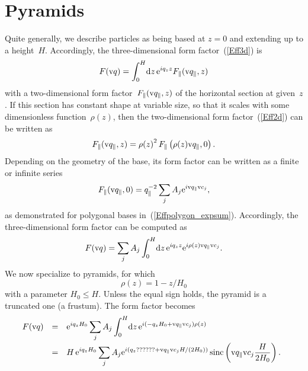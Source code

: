 %
%

\section{Pyramids}

%
%
%
%

Quite generally, we describe particles
as being based at $z=0$ and extending up to a height~$H$.
Accordingly,
the three-dimensional form factor~(\ref{Eff3d}) is
\begin{equation}
  F(\text{v}{q}) = \int_0^H\!\text{d} z\,\text{e}^{iq_z z} F_\parallel(\text{v}{q}_\parallel,z)
\end{equation}
with a two-dimensional form factor~$F_\parallel(\text{v}{q}_\parallel,z)$
of the horizontal section at given~$z$.
If this section has constant shape at variable size,
so that it scales with some dimensionless function~$\rho(z)$,
then the two-dimensional form factor~(\ref{Eff2d})
can be written as
\begin{equation}
  F_\parallel(\text{v}{q}_\parallel,z)
  = {\rho(z)}^2\, F_\parallel\left(\rho(z)\text{v}{q}_\parallel,0\right).
\end{equation}
Depending on the geometry of the base,
its form factor can be written as a finite or infinite series
\begin{equation}
  F_\parallel(\text{v}{q}_\parallel,0)=q_\parallel^{-2}\sum_j A_j \text{e}^{i\text{v}{q}_\parallel \text{v}{c}_j},
\end{equation}
as demonstrated for polygonal bases in~(\ref{Effpolygon_expsum}).
Accordingly, the three-dimensional form factor can be computed as
\begin{equation}
  F(\text{v}{q}) = \sum_j A_j \int_0^H\!\text{d} z\,\text{e}^{iq_z z} \text{e}^{i\rho(z)\text{v}{q}_\parallel \text{v}{c}_j}.
\end{equation}
We now specialize to pyramids,
for which
\begin{equation}
  \rho(z) = 1-z/H_0
\end{equation}
with a parameter $H_0\le H$.
Unless the equal sign holds,
the pyramid is a truncated one (a frustum).
The form factor becomes
\begin{equation}
  \begin{array}{@{}lcl}
  F(\q)
  &=& \displaystyle
       \e^{iq_z H_0} \sum_j A_j \int_0^H\!\d z\,\e^{i(-q_zH_0 +\q_\parallel \v{c}_j)\rho(z)}
\\[3ex]
  &=& \displaystyle
       H\, \e^{iq_z H_0} \sum_j A_j \e^{i(q_z ?????? + \q_\parallel\v{c}_jH/(2H_0))}
          \sinc\left(\q_\parallel\v{c}_j\frac{H}{2H_0}\right).
  \end{array}
\end{equation}

